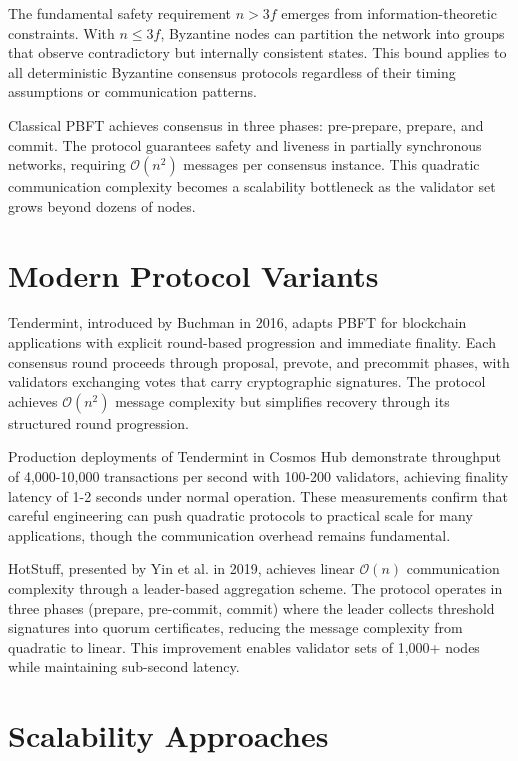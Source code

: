 \documentclass{article}
\begin{document}
The fundamental safety requirement $n > 3f$ emerges from information-theoretic constraints. With $n \leq 3f$, Byzantine nodes can partition the network into groups that observe contradictory but internally consistent states. This bound applies to all deterministic Byzantine consensus protocols regardless of their timing assumptions or communication patterns.

Classical PBFT achieves consensus in three phases: pre-prepare, prepare, and commit. The protocol guarantees safety and liveness in partially synchronous networks, requiring $\mathcal{O}(n^2)$ messages per consensus instance. This quadratic communication complexity becomes a scalability bottleneck as the validator set grows beyond dozens of nodes.

\section{Modern Protocol Variants}

Tendermint, introduced by Buchman in 2016, adapts PBFT for blockchain applications with explicit round-based progression and immediate finality. Each consensus round proceeds through proposal, prevote, and precommit phases, with validators exchanging votes that carry cryptographic signatures. The protocol achieves $\mathcal{O}(n^2)$ message complexity but simplifies recovery through its structured round progression.

Production deployments of Tendermint in Cosmos Hub demonstrate throughput of 4,000-10,000 transactions per second with 100-200 validators, achieving finality latency of 1-2 seconds under normal operation. These measurements confirm that careful engineering can push quadratic protocols to practical scale for many applications, though the communication overhead remains fundamental.

HotStuff, presented by Yin et al. in 2019, achieves linear $\mathcal{O}(n)$ communication complexity through a leader-based aggregation scheme. The protocol operates in three phases (prepare, pre-commit, commit) where the leader collects threshold signatures into quorum certificates, reducing the message complexity from quadratic to linear. This improvement enables validator sets of 1,000+ nodes while maintaining sub-second latency.

\section{Scalability Approaches}
\end{document}
